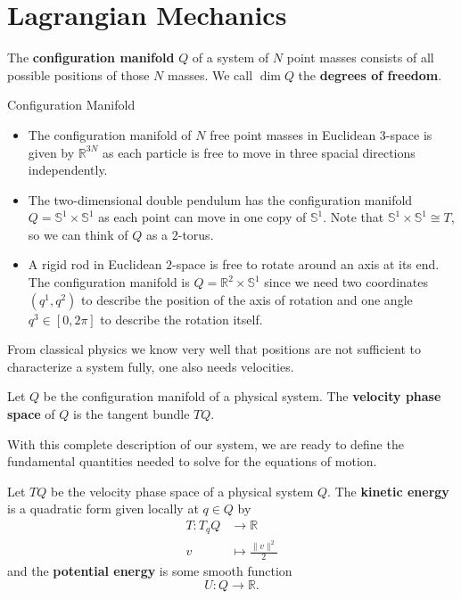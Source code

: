 \section{Lagrangian Mechanics}
\begin{definition}
    The \textbf{configuration manifold} $Q$ of a system of $N$ point masses consists of all possible positions of those $N$ masses. We call $\dim Q$ the \textbf{degrees of freedom}.
\end{definition}{Configuration Manifold}
\begin{eg}
    \begin{itemize}
        \item The configuration manifold of $N$ free point masses in Euclidean $3$-space is given by $\mathbb{R}^{3N}$ as each particle is free to move in three spacial directions independently.
        \item The two-dimensional double pendulum has the configuration manifold $Q=\mathbb{S}^1 \times \mathbb{S}^1$ as each point can move in one copy of $\mathbb{S}^1$. Note that $\mathbb{S}^1 \times \mathbb{S}^1 \cong T$, so we can think of $Q$ as a $2$-torus.
        \item A rigid rod in Euclidean $2$-space is free to rotate around an axis at its end. The configuration manifold is $Q=\mathbb{R}^2 \times \mathbb{S}^1$ since we need two coordinates $(q^1,q^2)$ to describe the position of the axis of rotation and one angle $q^3 \in [0, 2\pi]$ to describe the rotation itself.
    \end{itemize}
\end{eg}
From classical physics we know very well that positions are not sufficient to characterize a system fully, one also needs velocities.
\begin{definition}
    Let $Q$ be the configuration manifold of a physical system. The \textbf{velocity phase space} of $Q$ is the tangent bundle $TQ$.
\end{definition}
With this complete description of our system, we are ready to define the fundamental quantities needed to solve for the equations of motion.
\begin{definition}
    Let $TQ$ be the velocity phase space of a physical system $Q$. The \textbf{kinetic energy} is a quadratic form given locally at $q \in Q$ by
    \begin{align*}
        T: T_qQ &\to \mathbb{R}\\
        v &\mapsto \frac{\|v\|^2}{2}
    \end{align*}
    and the \textbf{potential energy} is some smooth function
    \[
    U: Q \to \mathbb{R}
    .\] 
\end{definition}
